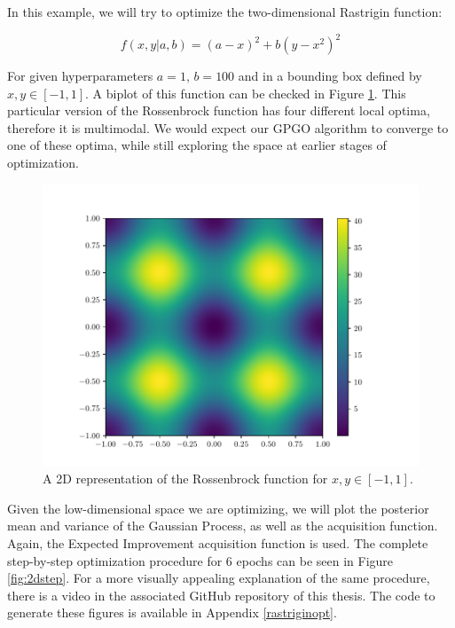 \documentclass[10pt,a4paper,twoside]{book}
\begin{document}
In this example, we will try to optimize the two-dimensional Rastrigin function:

\begin{equation}
f(x, y| a, b) = (a - x)^2 + b(y - x^2)^2
\end{equation}

For given hyperparameters $a=1,\, b=100$ and in a bounding box defined by $x,y \in [-1, 1]$. A biplot of this function can be checked in Figure \ref{fig:rosen}. This particular version of the Rossenbrock function has four different local optima, therefore it is multimodal. We would expect our GPGO algorithm to converge to one of these optima, while still exploring the space at earlier stages of optimization.\\

\begin{figure}
	\centering
	\caption{A 2D representation of the Rossenbrock function for $x, y \in [-1, 1]$.}
	\label{fig:rosen}
	\includegraphics[scale=0.5]{figures/chapter3/rosen/rosen}
\end{figure}

Given the low-dimensional space we are optimizing, we will plot the posterior mean and variance of the Gaussian Process, as well as the acquisition function. Again, the Expected Improvement acquisition function is used. The complete step-by-step optimization procedure for 6 epochs can be seen in Figure \ref{fig:2dstep}. For a more visually appealing explanation of the same procedure, there is a video in the associated GitHub repository of this thesis. The code to generate these figures is available in Appendix \ref{rastriginopt}.\\
\end{document}
